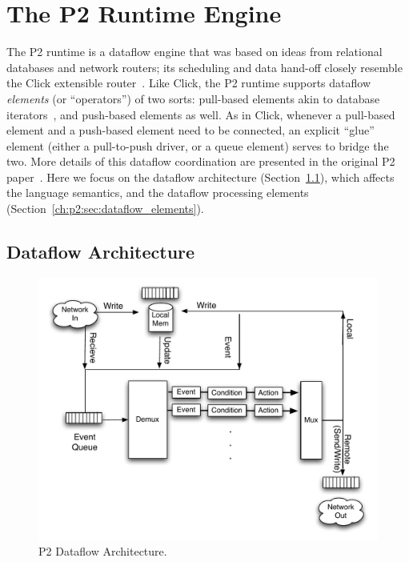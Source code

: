 \section{The P2 Runtime Engine}
\label{ch:p2:sec:p2}

The P2 runtime is a dataflow engine that was based on ideas from relational
databases and network routers; its scheduling and data hand-off closely
resemble the Click extensible router~\cite{click-tocs}.  Like Click, the P2
runtime supports dataflow {\em elements} (or ``operators'') of two sorts:
pull-based elements akin to database iterators~\cite{graefe-survey}, and
push-based elements as well.  As in Click, whenever a pull-based element and a
push-based element need to be connected, an explicit ``glue'' element (either a
pull-to-push driver, or a queue element) serves to bridge the two.  More
details of this dataflow coordination are presented in the original P2
paper~\cite{p2:sosp}.  Here we focus on the dataflow architecture
(Section~\ref{ch:p2:sec:dataflow}), which affects the language semantics, and
the dataflow processing elements (Section~\ref{ch:p2:sec:dataflow_elements}).

\subsection{Dataflow Architecture}
\label{ch:p2:sec:dataflow}

\begin{figure} 
\ssp
\begin{center}
\includegraphics[scale=0.6]{figures/p2-arch}
\caption{\label{ch:p2:fig:dataflow}P2 Dataflow Architecture.}
\end{center} 
\end{figure}

